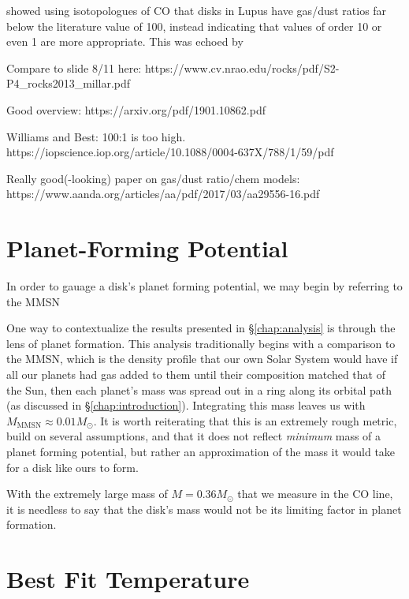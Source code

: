 \citet{Miotello2017} showed using isotopologues of CO that disks in Lupus have gas/dust ratios far below the literature value of 100, instead indicating that values of order 10 or even 1 are more appropriate. This was echoed by

Compare to slide 8/11 here:
https://www.cv.nrao.edu/rocks/pdf/S2-P4_rocks2013_millar.pdf


Good overview:
https://arxiv.org/pdf/1901.10862.pdf

Williams and Best: 100:1 is too high.
https://iopscience.iop.org/article/10.1088/0004-637X/788/1/59/pdf

Really good(-looking) paper on gas/dust ratio/chem models:
https://www.aanda.org/articles/aa/pdf/2017/03/aa29556-16.pdf




\section{Planet-Forming Potential}
\label{section:fitting_procedure}

In order to gauage a disk's planet forming potential, we may begin by referring to the MMSN

One way to contextualize the results presented in \S\ref{chap:analysis} is through the lens of planet formation. This analysis traditionally begins with a comparison to the MMSN, which is the density profile that our own Solar System would have if all our planets had gas added to them until their composition matched that of the Sun, then each planet's mass was spread out in a ring along its orbital path (as discussed in \S\ref{chap:introduction}). Integrating this mass leaves us with $M_\text{MMSN} \approx 0.01 M_\odot$. It is worth reiterating that this is an extremely rough metric, build on several assumptions, and that it does not reflect \textit{minimum} mass of a planet forming potential, but rather an approximation of the mass it would take for a disk like ours to form.

With the extremely large mass of $M = 0.36M_\odot$ that we measure in the CO line, it is needless to say that the disk's mass would not be its limiting factor in planet formation.





\section{Best Fit Temperature }
\label{section:fitting_procedure}

